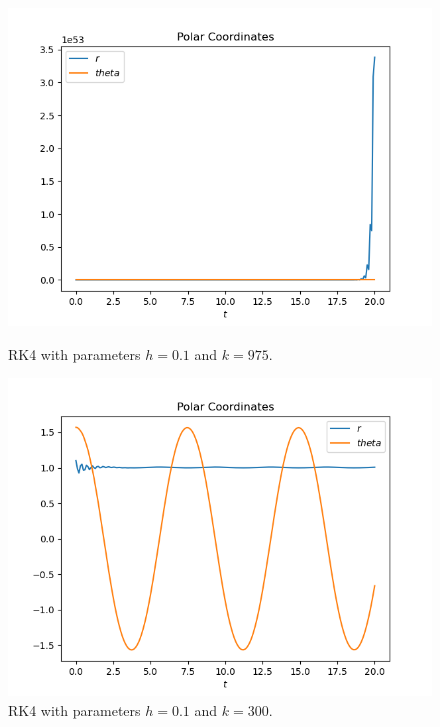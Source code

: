 \documentclass{report}
\begin{document}
\begin{figure}[h]
\centering
\begin{minipage}[b]{0.45\textwidth}
\centering
\includegraphics[width=\textwidth]{../Plots/RK4/rk4_h=0.1_k=975_c}
\caption{RK4 with parameters $h=0.1$ and $k=975$.}
\label{rk4_h=0.1_k=975_c}
\end{minipage}
\hfill
\begin{minipage}[b]{0.45\textwidth}
\centering
\includegraphics[width=\textwidth]{../Plots/RK4/rk4_h=0.1_k=300_c}
\caption{RK4 with parameters $h=0.1$ and $k=300$.}
\label{rk4_h=0.1_k=300_c}
\end{minipage}
\end{figure}
\end{document}
